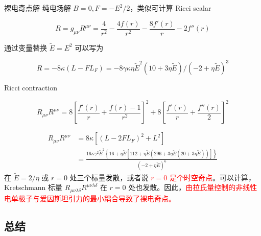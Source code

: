\documentclass[9pt, dvipsnames]{beamer} %
\begin{document}
\begin{frame}{裸电奇点解}
    纯电场解 $B=0,F=-E^2/2 $，类似可计算 Ricci scalar

    $$
    R
    =g_{\mu\nu} R^{\mu\nu}
    =\frac{4 }{r^2 } - \frac{4f(r) }{r^2 } - \frac{8f'(r) }{r } - 2f''(r) 
    $$

    通过变量替换 $\tilde{E}=E^2$ 可以写为
    
    $$
    R
    =-8\kappa \left(L-FL_F \right)
    =-8\gamma\kappa \eta\tilde{E}^2\left(10+3\eta\tilde{E} \right) \bigg/ \left(-2+\eta\tilde{E} \right)^3 
    $$
    
    Ricci contraction
    
    $$
    R_{\mu\nu} R^{\mu\nu}
    =8\left[\frac{f'(r) }{r } + \frac{f(r)-1 }{r^2 }  \right]^2 + 8 \left[\frac{f'(r) }{r } + \frac{f''(r) }{2 }  \right]^2
    $$
    
    $$
    \begin{aligned}
        R_{\mu\nu} R^{\mu\nu}
        &=8\kappa\left[\left(L - 2FL_F \right)^2 + L^2 \right] \\
        &=\frac{16\kappa \gamma^2 \tilde{E}^2 \left\{16+\eta \tilde{E}\left[112+\eta\tilde{E}\left(296+3\eta \tilde{E}\left(20+3\eta\tilde{E} \right) \right) \right] \right\} }{\left(-2+\eta\tilde{E} \right)^6 }
    \end{aligned}
    $$ 
    在 $\tilde{E}=2/\eta $ 或 $r=0$ 处三个标量发散，或者说 \textcolor{red}{$r=0$ 是个时空奇点}。可以计算，Kretschmann 标量 $R_{\mu\nu\lambda\delta}R^{\mu\nu\lambda\delta}  $ 在 $r=0$ 处也发散。因此，\textcolor{red}{由拉氏量控制的非线性电单极子与爱因斯坦引力的最小耦合导致了裸电奇点。}
\end{frame}

\subsection{总结}
\end{document}
